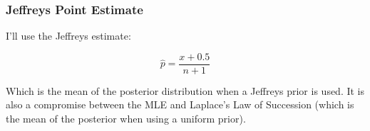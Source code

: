 \documentclass{beamer}\usepackage{knitr}
\begin{document}
\begin{frame}
\frametitle{Jeffreys Point Estimate}
I'll use the Jeffreys estimate:

\begin{equation*}
  \hat{p} = \frac{x + 0.5}{n + 1}
\end{equation*}

Which is the mean of the posterior distribution when a Jeffreys prior is used. It is also a compromise between the MLE and Laplace's Law of Succession (which is the mean of the posterior when using a uniform prior).

\end{frame}

% 
% 
\end{document}

